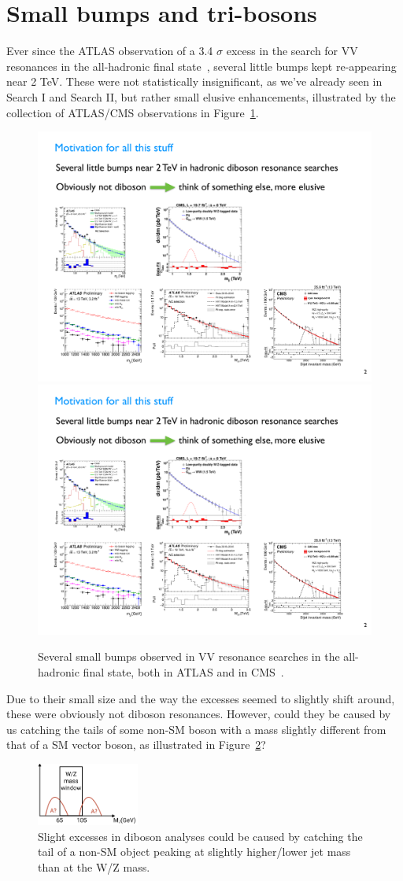 \section{Small bumps and tri-bosons}
Ever since the ATLAS observation of a 3.4 $\sigma$ excess in the search for VV resonances in the all-hadronic final state~\cite{Aad2015}, several little bumps kept re-appearing near 2 TeV. These were not statistically insignificant, as we've already seen in Search I and Search II, but rather small elusive enhancements, illustrated by the collection of ATLAS/CMS observations in Figure~\ref{fig:searchIII:bumps}.
\begin{figure}[ht] 
    \centering
    \includegraphics[height=0.2\textwidth]{figures/analysis/search3/misc/bumps2.pdf}\\
    \includegraphics[height=0.2\textwidth]{figures/analysis/search3/misc/bumps1.pdf}\\
    \caption{Several small bumps observed in VV resonance searches in the all-hadronic final state, both in ATLAS and in CMS~\cite{stealth}.}
    \label{fig:searchIII:bumps}
\end{figure}
Due to their small size and the way the excesses seemed to slightly shift around, these were obviously not diboson resonances. However, could they be caused by us catching the tails of some non-SM boson with a mass slightly different from that of a SM vector boson, as illustrated in Figure~\ref{fig:searchIII:tails}?
\begin{figure}[ht] 
    \centering
    \includegraphics[width=0.3\textwidth]{figures/analysis/search3/misc/tails.png}
    \caption{Slight excesses in diboson analyses could be caused by catching the tail of a non-SM object peaking at slightly higher/lower jet mass than at the W/Z mass.}
    \label{fig:searchIII:tails}
\end{figure}
